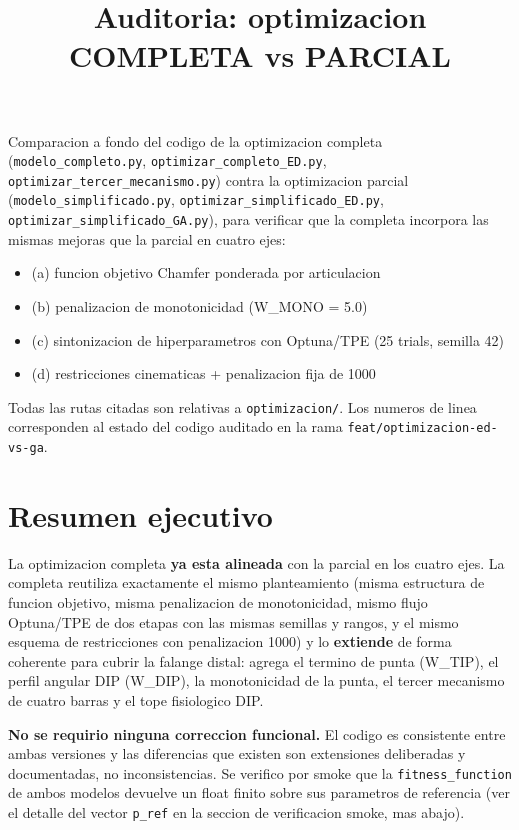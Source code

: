 \documentclass[11pt,a4paper]{article}
\title{Auditoria: optimizacion COMPLETA vs PARCIAL}
\author{}
\date{}
\newcommand{\code}[1]{\texttt{#1}}
\begin{document}
\maketitle

Comparacion a fondo del codigo de la optimizacion completa
(\code{modelo\_completo.py}, \code{optimizar\_completo\_ED.py},
\code{optimizar\_tercer\_mecanismo.py}) contra la optimizacion parcial
(\code{modelo\_simplificado.py}, \code{optimizar\_simplificado\_ED.py},
\code{optimizar\_simplificado\_GA.py}), para verificar que la completa incorpora
las mismas mejoras que la parcial en cuatro ejes:

\begin{itemize}[leftmargin=1.4em]
  \item (a) funcion objetivo Chamfer ponderada por articulacion
  \item (b) penalizacion de monotonicidad (W\_MONO = 5.0)
  \item (c) sintonizacion de hiperparametros con Optuna/TPE (25 trials, semilla 42)
  \item (d) restricciones cinematicas + penalizacion fija de 1000
\end{itemize}

Todas las rutas citadas son relativas a \code{optimizacion/}. Los numeros de
linea corresponden al estado del codigo auditado en la rama
\code{feat/optimizacion-ed-vs-ga}.

\section{Resumen ejecutivo}

La optimizacion completa \textbf{ya esta alineada} con la parcial en los cuatro
ejes. La completa reutiliza exactamente el mismo planteamiento (misma estructura
de funcion objetivo, misma penalizacion de monotonicidad, mismo flujo Optuna/TPE
de dos etapas con las mismas semillas y rangos, y el mismo esquema de
restricciones con penalizacion 1000) y lo \textbf{extiende} de forma coherente
para cubrir la falange distal: agrega el termino de punta (W\_TIP), el perfil
angular DIP (W\_DIP), la monotonicidad de la punta, el tercer mecanismo de cuatro
barras y el tope fisiologico DIP.

\textbf{No se requirio ninguna correccion funcional.} El codigo es consistente
entre ambas versiones y las diferencias que existen son extensiones deliberadas y
documentadas, no inconsistencias. Se verifico por smoke que la
\code{fitness\_function} de ambos modelos devuelve un float finito sobre sus
parametros de referencia (ver el detalle del vector \code{p\_ref} en la seccion
de verificacion smoke, mas abajo).
\end{document}
